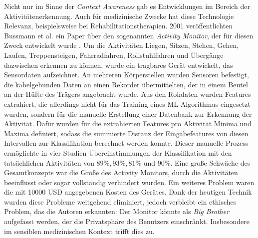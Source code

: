 Nicht nur im Sinne der \textit{Context Awareness} gab es Entwicklungen im Bereich der Aktivitätenerkennung. Auch für medizinische Zwecke hat diese Technologie Relevanz, beispielsweise bei Rehabilitationstherapien. 2001 veröffentlichten Bussmann et al. ein Paper über den sogenannten \textit{Activity Monitor}, der für diesen Zweck entwickelt wurde \cite{Bussmann2001}. Um die Aktivitäten Liegen, Sitzen, Stehen, Gehen, Laufen, Treppensteigen, Fahrradfahren, Rollstuhlfahren und Übergänge dazwischen erkennen zu können, wurde ein tragbares Gerät entwickelt, das Sensordaten aufzeichnet. An mehreren Körperstellen wurden Sensoren befestigt, die kabelgebunden Daten an einen Rekorder übermittelten, der in einem Beutel an der Hüfte des Trägers angebracht wurde. Aus den Rohdaten wurden Features extrahiert, die allerdings nicht für das Training eines ML-Algorithmus eingesetzt wurden, sondern für die manuelle Erstellung einer Datenbank zur Erkennung der Aktivität. Dafür wurden für die extrahierten Features pro Aktivität Minima und Maxima definiert, sodass die summierte Distanz der Eingabefeatures von diesen Intervallen zur Klassifikation berechnet werden konnte. Dieser manuelle Prozess ermöglichte in vier Studien Übereinstimmungen der Klassifikation mit den tatsächlichen Aktivitäten von $89 \%, 93 \%, 81 \%$ und $90 \%$. Eine große Schwäche des Gesamtkonzepts war die Größe des Activity Monitors, durch die Aktivitäten beeinflusst oder sogar vollständig verhindert wurden. Ein weiteres Problem waren die mit 10000 USD angegebenen Kosten des Gerätes. Dank der heutigen Technik wurden diese Probleme weitgehend eliminiert, jedoch verbleibt ein ethisches Problem, das die Autoren erkannten: Der Monitor könnte als \textit{Big Brother} aufgefasst werden, der die Privatsphäre des Benutzers einschränkt. Insbesondere im sensiblen medizinischen Kontext trifft dies zu.

